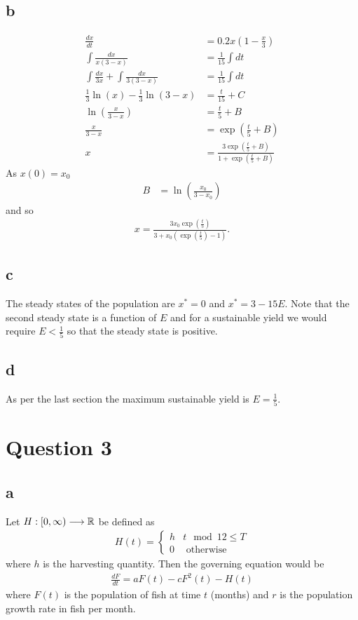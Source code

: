\documentclass{unswmaths}
\begin{document}
\subsection*{b}
	\begin{align*}
		\frac{dx}{dt} &= 0.2x\left( 1 - \frac{x}{3} \right) \\
		\int \frac{dx}{x(3-x)} &= \frac{1}{15} \int dt \\
		\int \frac{dx}{3x} + \int \frac{dx}{3(3-x)} &= \frac{1}{15} \int dt \\
		\frac{1}{3} \ln(x) - \frac{1}{3} \ln(3-x) &= \frac{t}{15} + C \\
		\ln \left( \frac{x}{3-x} \right) &= \frac{t}{5} + B \\
		\frac{x}{3-x} &= \exp(\frac{t}{5} + B) \\
		x &= \frac{3\exp(\frac{t}{5} + B)}{1 + \exp(\frac{t}{5} + B)}
	\end{align*}
	As $ x(0) = x_0 $
	\begin{align*}
		B &= \ln \left( \frac{x_0}{3-x_0} \right)
	\end{align*}
	and so
	\begin{align*}
		x = \frac{3 x_0 \exp(\frac{t}{5})}{3 + x_0 (\exp(\frac{t}{5}) - 1)}.
	\end{align*}
\subsection*{c}
	The steady states of the population are
	$ x^* = 0 $ and $ x^* = 3 - 15E $. Note that the second steady state is a function of $ E $ and for a sustainable yield we would require $ E < \frac{1}{5} $ so that the steady state is positive.
	
\subsection*{d}
	As per the last section the maximum sustainable yield is $ E = \frac{1}{5} $.

\section*{Question 3}
\subsection*{a}
Let $ H : [0, \infty) \longrightarrow \mathbb{R} $ be defined as
\begin{align*}
    H(t) = 
    \begin{cases}
        h & t \mod 12 \leq T \\
        0 & \text{ otherwise }
    \end{cases}
\end{align*}
where $ h $ is the harvesting quantity. 
Then the governing equation would be
\begin{align*}
    \frac{dF}{dt} = aF(t) - cF^2(t) - H(t)
\end{align*}
where $ F(t) $ is the population of fish at time $ t $ (months) and $ r $ is the population growth rate in fish per month.
\end{document}
